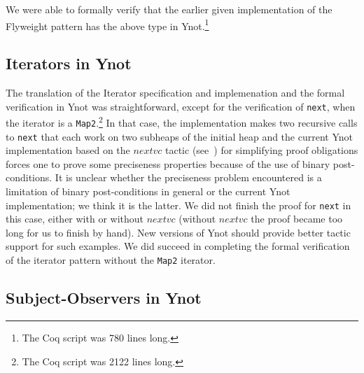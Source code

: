 We were able to formally verify that the earlier given implementation of
the Flyweight pattern has the above type in Ynot.\footnote{The Coq script was 
780 lines long.}

\subsection{Iterators in Ynot}
\label{sec:iterators-in-ynot}

The translation of the Iterator specification and implemenation and the
formal verification in Ynot was straightforward, except for the
verification of {\tt next}, when the iterator is a {\tt Map2}.\footnote{The
Coq script was 2122 lines long.}  In that case, the implementation makes
two recursive calls to {\tt next} that each work on two subheaps of the
initial heap and the current Ynot implementation based on the $nextvc$
tactic (see~\cite{nanevski08}) for simplifying proof obligations forces one
to prove some preciseness properties because of the use of binary
post-conditions. It is unclear whether the preciseness problem encountered
is a limitation of binary post-conditions in general or the current Ynot
implementation; we think it is the latter. We did not finish the proof for
{\tt next} in this case, either with or without $nextvc$ (without $nextvc$
the proof became too long for us to finish by hand).  New versions of Ynot
should provide better tactic support for such examples. 
We did succeed in completing the formal verification of the
iterator pattern  without the {\tt Map2} iterator.

\subsection{Subject-Observers in Ynot}
\label{sec:subject-observer-in-ynot}

